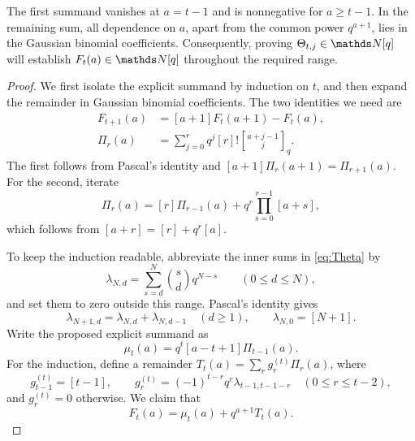 \documentclass[11pt]{amsart}
\newcommand{\qbinom}[2]{\genfrac{[}{]}{0pt}{}{#1}{#2}_{q}}
\begin{document}
The first summand vanishes at $a=t-1$ and is nonnegative for
$a\ge t-1$. In the remaining sum, all dependence on $a$, apart from
the common power $q^{a+1}$, lies in the Gaussian binomial coefficients.
Consequently, proving $\Theta_{t,j}\in\N[q]$ will establish
$F_t(a)\in\N[q]$ throughout the required range.

\begin{proof}
We first isolate the explicit summand by induction on $t$, and then
expand the remainder in Gaussian binomial coefficients. The two
identities we need are
\begin{align}
 F_{t+1}(a)&=[a+1]F_t(a+1)-F_t(a),\label{eq:Frec}\\
 \Pi_r(a)&=\sum_{j=0}^{r}q^j[r]!\qbinom{a+j-1}{j}.
 \label{eq:basis}
\end{align}
The first follows from Pascal's identity and
$[a+1]\Pi_r(a+1)=\Pi_{r+1}(a)$. For the second, iterate
\[
 \Pi_r(a)=[r]\Pi_{r-1}(a)
       +q^r\prod_{s=0}^{r-1}[a+s],
\]
which follows from $[a+r]=[r]+q^r[a]$.

To keep the induction readable, abbreviate the inner sums in
\eqref{eq:Theta} by
\begin{equation}\label{eq:lambda}
 \lambda_{N,d}=\sum_{s=d}^{N}\binom{s}{d}q^{N-s}
 \qquad(0\le d\le N),
\end{equation}
and set them to zero outside this range. Pascal's identity gives
\begin{equation}\label{eq:lambdarec}
 \lambda_{N+1,d}=\lambda_{N,d}+\lambda_{N,d-1}
 \quad(d\ge1),\qquad \lambda_{N,0}=[N+1].
\end{equation}
Write the proposed explicit summand as
\[
 \mu_t(a)=q^t[a-t+1]\Pi_{t-1}(a).
\]
For the induction, define a remainder $T_t(a)=\sum_r g^{(t)}_r\Pi_r(a)$,
where
\[
 g^{(t)}_{t-1}=[t-1],\qquad
 g^{(t)}_r=(-1)^{t-r}q^r\lambda_{t-1,t-1-r}
 \quad(0\le r\le t-2),
\]
and $g^{(t)}_r=0$ otherwise. We claim that
\begin{equation}\label{eq:FT}
 F_t(a)=\mu_t(a)+q^{a+1}T_t(a).
\end{equation}


\end{proof}
\end{document}
